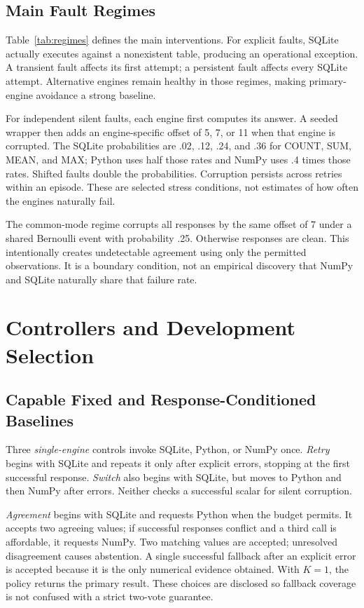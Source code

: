 \documentclass{svproc}
\begin{document}
\subsection{Main Fault Regimes}

Table~\ref{tab:regimes} defines the main interventions. For explicit faults, SQLite actually executes against a nonexistent table, producing an operational exception. A transient fault affects its first attempt; a persistent fault affects every SQLite attempt. Alternative engines remain healthy in those regimes, making primary-engine avoidance a strong baseline.

For independent silent faults, each engine first computes its answer. A seeded wrapper then adds an engine-specific offset of 5, 7, or 11 when that engine is corrupted. The SQLite probabilities are .02, .12, .24, and .36 for COUNT, SUM, MEAN, and MAX; Python uses half those rates and NumPy uses .4 times those rates. Shifted faults double the probabilities. Corruption persists across retries within an episode. These are selected stress conditions, not estimates of how often the engines naturally fail.

The common-mode regime corrupts all responses by the same offset of 7 under a shared Bernoulli event with probability .25. Otherwise responses are clean. This intentionally creates undetectable agreement using only the permitted observations. It is a boundary condition, not an empirical discovery that NumPy and SQLite naturally share that failure rate.

\section{Controllers and Development Selection}
\subsection{Capable Fixed and Response-Conditioned Baselines}
Three \emph{single-engine} controls invoke SQLite, Python, or NumPy once. \emph{Retry} begins with SQLite and repeats it only after explicit errors, stopping at the first successful response. \emph{Switch} also begins with SQLite, but moves to Python and then NumPy after errors. Neither checks a successful scalar for silent corruption.

\emph{Agreement} begins with SQLite and requests Python when the budget permits. It accepts two agreeing values; if successful responses conflict and a third call is affordable, it requests NumPy. Two matching values are accepted; unresolved disagreement causes abstention. A single successful fallback after an explicit error is accepted because it is the only numerical evidence obtained. With $K=1$, the policy returns the primary result. These choices are disclosed so fallback coverage is not confused with a strict two-vote guarantee.
\end{document}
